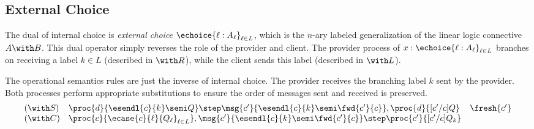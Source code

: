 \subsection*{External Choice}
The dual of internal choice is \emph{external choice} $\echoice{\ell :
A_\ell}_{\ell \in L}$, which is the $n$-ary labeled generalization of the
linear logic connective $A \with B$. This dual operator simply reverses
the role of the provider and client. The provider process of
$x : \echoice{\ell : A_\ell}_{\ell \in L}$ branches on receiving a label
$k \in L$ (described in $\with R$), while the client sends this label
(described in $\with L$).

The operational semantics rules are just the inverse of internal choice.
The provider receives the branching label $k$ sent by the provider. Both
processes perform appropriate substitutions to ensure the order of messages
sent and received is preserved.
\[
\begin{array}{lll}
(\with S) & \proc{d}{\esendl{c}{k} \semi Q} \step \msg{c'}{\esendl{c}{k}
\semi \fwd{c'}{c}}, \proc{d}{[c'/c]Q} & \fresh{c'} \\
(\with C) & \proc{c}{\ecase{c}{\ell}{Q_\ell}_{\ell \in L}},
\msg{c'}{\esendl{c}{k} \semi \fwd{c'}{c}} \step \proc{c'}{[c'/c]Q_k}
\end{array}
\]


